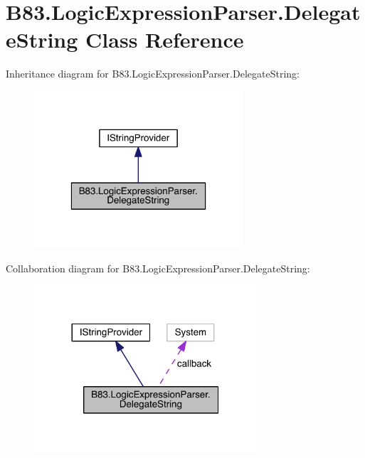 \hypertarget{class_b83_1_1_logic_expression_parser_1_1_delegate_string}{}\section{B83.\+Logic\+Expression\+Parser.\+Delegate\+String Class Reference}
\label{class_b83_1_1_logic_expression_parser_1_1_delegate_string}


Inheritance diagram for B83.\+Logic\+Expression\+Parser.\+Delegate\+String\+:\nopagebreak
\begin{figure}[H]
\begin{center}
\leavevmode
\includegraphics[width=220pt]{class_b83_1_1_logic_expression_parser_1_1_delegate_string__inherit__graph}
\end{center}
\end{figure}


Collaboration diagram for B83.\+Logic\+Expression\+Parser.\+Delegate\+String\+:\nopagebreak
\begin{figure}[H]
\begin{center}
\leavevmode
\includegraphics[width=233pt]{class_b83_1_1_logic_expression_parser_1_1_delegate_string__coll__graph}
\end{center}
\end{figure}
